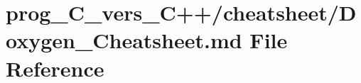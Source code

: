 \hypertarget{prog__C__vers__C_09_09_2cheatsheet_2Doxygen__Cheatsheet_8md}{}\section{prog\+\_\+\+C\+\_\+vers\+\_\+\+C++/cheatsheet/\+Doxygen\+\_\+\+Cheatsheet.md File Reference}
\label{prog__C__vers__C_09_09_2cheatsheet_2Doxygen__Cheatsheet_8md}
